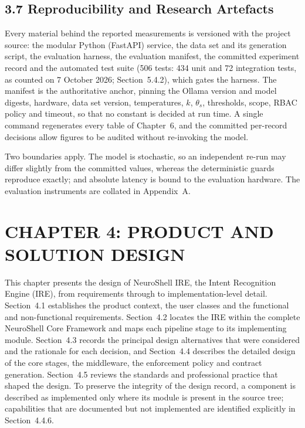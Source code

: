 \documentclass[
]{article}
\begin{document}
\hypertarget{reproducibility-and-research-artefacts}{%
\subsection{3.7 Reproducibility and Research
Artefacts}\label{reproducibility-and-research-artefacts}}

Every material behind the reported measurements is versioned with the
project source: the modular Python (FastAPI) service, the data set and
its generation script, the evaluation harness, the evaluation manifest,
the committed experiment record and the automated test suite (506 tests:
434 unit and 72 integration tests, as counted on 7 October 2026;
Section~5.4.2), which gates the harness. The manifest is the
authoritative anchor, pinning the Ollama version and model digests,
hardware, data set version, temperatures, \(k\), \(\theta_{s}\),
thresholds, scope, RBAC policy and timeout, so that no constant is
decided at run time. A single command regenerates every table of
Chapter~6, and the committed per-record decisions allow figures to be
audited without re-invoking the model.

Two boundaries apply. The model is stochastic, so an independent re-run
may differ slightly from the committed values, whereas the deterministic
guards reproduce exactly; and absolute latency is bound to the
evaluation hardware. The evaluation instruments are collated in
Appendix~A.

\hypertarget{chapter-4-product-and-solution-design}{%
\section{CHAPTER 4: PRODUCT AND SOLUTION
DESIGN}\label{chapter-4-product-and-solution-design}}

This chapter presents the design of NeuroShell IRE, the Intent
Recognition Engine (IRE), from requirements through to
implementation-level detail. Section~4.1 establishes the product
context, the user classes and the functional and non-functional
requirements. Section~4.2 locates the IRE within the complete NeuroShell
Core Framework and maps each pipeline stage to its implementing module.
Section~4.3 records the principal design alternatives that were
considered and the rationale for each decision, and Section~4.4
describes the detailed design of the core stages, the middleware, the
enforcement policy and contract generation. Section~4.5 reviews the
standards and professional practice that shaped the design. To preserve
the integrity of the design record, a component is described as
implemented only where its module is present in the source tree;
capabilities that are documented but not implemented are identified
explicitly in Section~4.4.6.
\end{document}
